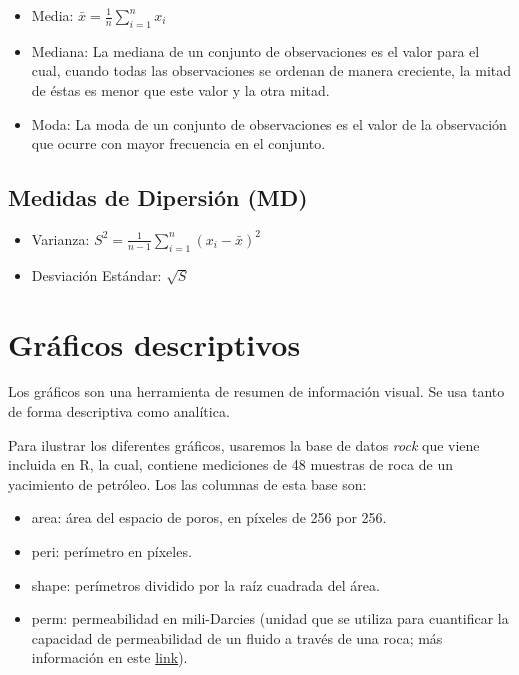 \documentclass[
]{book}
\providecommand{\tightlist}{%
  \setlength{\itemsep}{0pt}\setlength{\parskip}{0pt}}
\theoremstyle{definition}
\theoremstyle{definition}
\theoremstyle{definition}
\theoremstyle{definition}
\theoremstyle{remark}
\begin{document}
\begin{itemize}
\tightlist
\item
  Media: \(\bar{x} = \displaystyle\frac{1}{n}\displaystyle\sum_{i=1}^n x_i\)
\item
  Mediana: La mediana de un conjunto de observaciones es el valor para el cual, cuando todas las observaciones se ordenan de manera creciente, la mitad de éstas es menor que este valor y la otra mitad.
\item
  Moda: La moda de un conjunto de observaciones es el valor de la observación que ocurre con mayor frecuencia en el conjunto.
\end{itemize}

\hypertarget{medidas-de-dipersiuxf3n-md}{%
\subsection*{Medidas de Dipersión (MD)}\label{medidas-de-dipersiuxf3n-md}}

\begin{itemize}
\tightlist
\item
  Varianza: \(S^2 = \displaystyle{\frac{1}{n-1}\sum_{i=1}^n (x_i-\bar{x})^2}\)
\item
  Desviación Estándar: \(\sqrt{S}\)
\end{itemize}

\hypertarget{gruxe1ficos-descriptivos}{%
\section{Gráficos descriptivos}\label{gruxe1ficos-descriptivos}}

Los gráficos son una herramienta de resumen de información visual. Se usa tanto de forma descriptiva como analítica.

Para ilustrar los diferentes gráficos, usaremos la base de datos \emph{rock} que viene incluida en R, la cual, contiene mediciones de 48 muestras de roca de un yacimiento de petróleo. Los las columnas de esta base son:

\begin{itemize}
\tightlist
\item
  area: área del espacio de poros, en píxeles de 256 por 256.
\item
  peri: perímetro en píxeles.
\item
  shape: perímetros dividido por la raíz cuadrada del área.
\item
  perm: permeabilidad en mili-Darcies (unidad que se utiliza para cuantificar la capacidad de permeabilidad de un fluido a través de una roca; más información en este \href{https://en.wikipedia.org/wiki/Darcy_(unit)}{link}).
\end{itemize}
\end{document}
